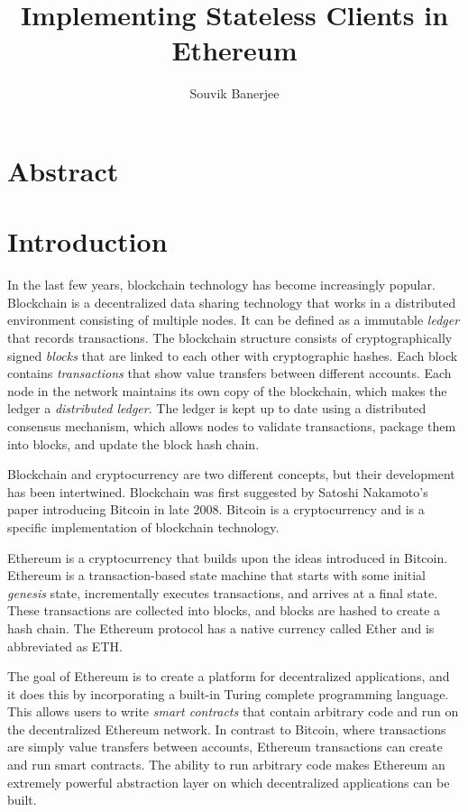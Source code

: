 \documentclass[12pt]{article}
\title{Implementing Stateless Clients in Ethereum}
\author{Souvik Banerjee}
\date{}
\newcounter{protocol}
\begin{document}
\maketitle

\section{Abstract}

\section{Introduction}


In the last few years, blockchain technology has become increasingly popular.
Blockchain is a decentralized data sharing technology that works in a distributed environment consisting of multiple nodes. It can be defined as a immutable \emph{ledger} that records transactions. The blockchain structure consists of cryptographically signed \emph{blocks} that are linked to each other with cryptographic hashes. Each block contains \emph{transactions} that show value transfers between different accounts. Each node in the network maintains its own copy of the blockchain, which makes the ledger a \emph{distributed ledger}. The ledger is kept up to date using a distributed consensus mechanism, which allows nodes to validate transactions, package them into blocks, and update the block hash chain.

Blockchain and cryptocurrency are two different concepts, but their development has been intertwined. Blockchain was first suggested by Satoshi Nakamoto's paper introducing Bitcoin in late 2008. Bitcoin is a cryptocurrency and is a specific implementation of blockchain technology.

Ethereum is a cryptocurrency that builds upon the ideas introduced in Bitcoin. Ethereum is a transaction-based state machine that starts with some initial \emph{genesis} state, incrementally executes transactions, and arrives at a final state. These transactions are collected into blocks, and blocks are hashed to create a hash chain. The Ethereum protocol has a native currency called Ether and is abbreviated as ETH.

The goal of Ethereum is to create a platform for decentralized applications, and it does this by incorporating a built-in Turing complete programming language. This allows users to write \emph{smart contracts} that contain arbitrary code and run on the decentralized Ethereum network. In contrast to Bitcoin, where transactions are simply value transfers between accounts, Ethereum transactions can create and run smart contracts. The ability to run arbitrary code makes Ethereum an extremely powerful abstraction layer on which decentralized applications can be built.
\end{document}
